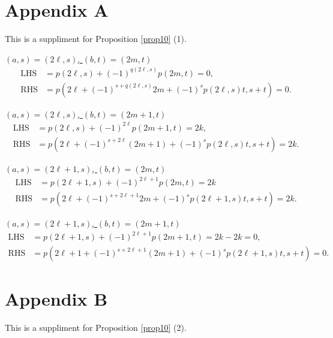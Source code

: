 \documentclass[12pt]{amsart}
\theoremstyle{definition}
\begin{document}
\section*{Appendix A}
This is a suppliment for Proposition \ref{prop10} (1).
\medskip

{\tiny
\noindent\underline{$(a,s)=(2\ell,s)$, $(b,t)=(2m,t)$}
\begin{align*}
  \text{LHS} &= p(2\ell,s)+(-1)^{q(2\ell,s)}p(2m,t)=0,\\
  \text{RHS} &= p(2\ell+(-1)^{s+q(2\ell,s)}2m+(-1)^sp(2\ell,s)t,s+t)=0.
\end{align*}

\noindent\underline{$(a,s)=(2\ell,s)$, $(b,t)=(2m+1,t)$}
\begin{align*}
  \text{LHS} &= p(2\ell,s)+(-1)^{2\ell}p(2m+1,t)=2k,\\
  \text{RHS} &= p(2\ell+(-1)^{s+2\ell}(2m+1)+(-1)^sp(2\ell,s)t,s+t)=2k.
\end{align*}

\noindent\underline{$(a,s)=(2\ell+1,s)$, $(b,t)=(2m,t)$}
\begin{align*}
  \text{LHS} &= p(2\ell+1,s)+(-1)^{2\ell+1}p(2m,t)=2k\\
  \text{RHS} &= p(2\ell+(-1)^{s+2\ell+1}2m+(-1)^sp(2\ell+1,s)t,s+t)
                                   =2k.
\end{align*}

\noindent\underline{$(a,s)=(2\ell+1,s)$, $(b,t)=(2m+1,t)$}
\begin{align*}
  \text{LHS} &= p(2\ell+1,s)+(-1)^{2\ell+1}p(2m+1,t)
                                   =2k-2k=0,\\
  \text{RHS} &= p(2\ell+1+(-1)^{s+2\ell+1}(2m+1)+(-1)^sp(2\ell+1,s)t,s+t)
                                   =0.
\end{align*}
}

\section*{Appendix B}
This is a suppliment for Proposition \ref{prop10} (2).
\medskip
\end{document}
